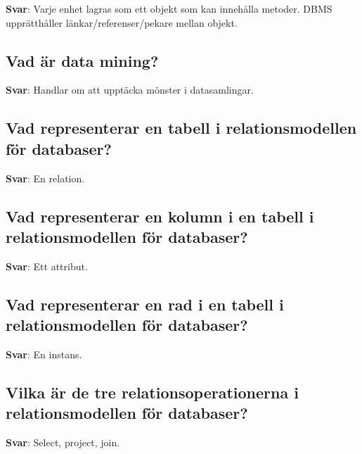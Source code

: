 \documentclass[a4paper,11pt,oneside]{article}
\begin{document}
\begin{sloppypar}
\label{q:291:sa:sv:True}

\textbf{Svar}: Varje enhet lagras som ett objekt som kan inneh\r{a}lla metoder. DBMS uppr\"atth\r{a}ller l\"ankar/referenser/pekare mellan objekt.



\subsection{Vad \"ar data mining?}

\label{q:292:sa:sv:True}

\textbf{Svar}: Handlar om att uppt\"acka m\"onster i datasamlingar.



\subsection{Vad representerar en tabell i relationsmodellen f\"or databaser?}

\label{q:293:sa:sv:True}

\textbf{Svar}: En relation.



\subsection{Vad representerar en kolumn i en tabell i relationsmodellen f\"or databaser?}

\label{q:294:sa:sv:True}

\textbf{Svar}: Ett attribut.



\subsection{Vad representerar en rad i en tabell i relationsmodellen f\"or databaser?}

\label{q:295:sa:sv:True}

\textbf{Svar}: En instans.



\subsection{Vilka \"ar de tre relationsoperationerna i relationsmodellen f\"or databaser?}

\label{q:296:sa:sv:True}

\textbf{Svar}: Select, project, join.




\end{sloppypar}
\end{document}
